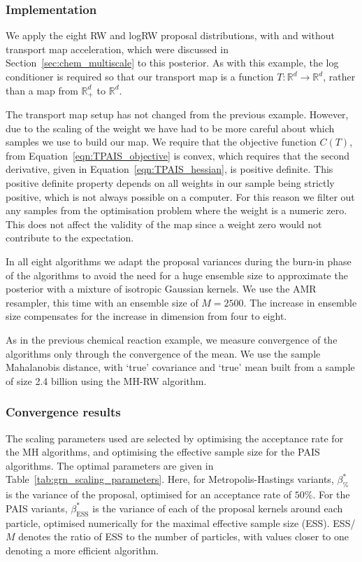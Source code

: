 \documentclass[final]{siamltex}
\begin{document}
\subsubsection{Implementation}

We apply the eight RW and logRW proposal distributions, with and
without transport map acceleration, which were discussed in
Section~\ref{sec:chem_multiscale} to this posterior. As with this
example, the log conditioner is required so that our transport map is a function $T\colon\mathbb{R}^d\rightarrow\mathbb{R}^d$, rather than a map from $\mathbb{R}_+^d$ to $\mathbb{R}^d$.

The transport map setup has not changed from the previous example. However, due to the scaling of the weight we have had to be more careful about which samples we use to build our map. We require that the objective function $C(T)$, from Equation~\eqref{eqn:TPAIS_objective} is convex, which requires that the second derivative, given in Equation~\eqref{eqn:TPAIS_hessian}, is positive definite. This positive definite property depends on all weights in our sample being strictly positive, which is not always possible on a computer. For this reason we filter out any samples from the optimisation problem where the weight is a numeric zero. This does not affect the validity of the map since a weight zero would not contribute to the expectation.

In all eight algorithms we adapt the proposal variances during the
burn-in phase of the algorithms to avoid the need for a huge ensemble size to approximate the posterior with a mixture of isotropic Gaussian kernels.
We use the AMR resampler, this time with an ensemble size of $M=2500$. The increase in ensemble size compensates for the increase in dimension from four to eight.

As in the previous chemical reaction example, we measure convergence of the algorithms only through the convergence of the mean. We use the sample Mahalanobis distance, with `true' covariance and `true' mean built from a sample of size 2.4 billion using the MH-RW algorithm.

\subsubsection{Convergence results}

The scaling parameters used are selected by optimising the acceptance
rate for the MH algorithms, and optimising the effective sample size
for the PAIS algorithms. The optimal parameters are given in
Table~\ref{tab:grn_scaling_parameters}. Here, for Metropolis-Hastings
variants, $\beta_{\%}^*$ is the variance of the proposal, optimised
for an acceptance rate of $50\%$. For the PAIS variants,
$\beta_{\text{ESS}}^*$ is the variance of each of the proposal kernels
around each particle, optimised numerically for the maximal effective
sample size (ESS). ESS/$M$ denotes the ratio of ESS to the number of
particles, with values closer to one denoting a more efficient algorithm.
\end{document}
